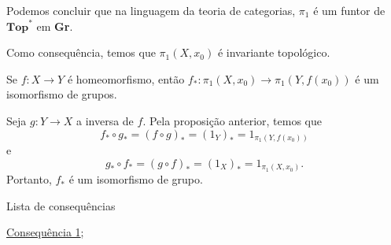 Podemos concluir que na linguagem da teoria de categorias, $\pi_1$ é um funtor de $\textbf{Top}^*$ em \textbf{Gr}. 

Como consequência, temos que $\pi_1(X,x_0)$ é invariante topológico.

\begin{corol}
    Se $f:X\rightarrow Y$ é homeomorfismo, então $f_*:\pi_1 (X,x_0)\rightarrow \pi_1(Y,f(x_0))$ é um isomorfismo de grupos.
\end{corol}

\begin{dem}
    Seja $g:Y\rightarrow X$ a inversa de $f.$ Pela proposição anterior, temos que 
    $$f_*\circ g_*=(f\circ g)_*=(1_Y)_*=1_{\pi_1(Y,f(x_0))}$$
    e 
    $$g_*\circ f_*=(g\circ f)_*=(1_X)_*=1_{\pi_1 (X,x_0)}.$$
    Portanto, $f_*$ é um isomorfismo de grupo.
\end{dem}

\begin{titlemize}{Lista de consequências}
	\item \hyperref[consequencia1]{Consequência 1};\\ %
	\item \hyperref[]{}
\end{titlemize}
